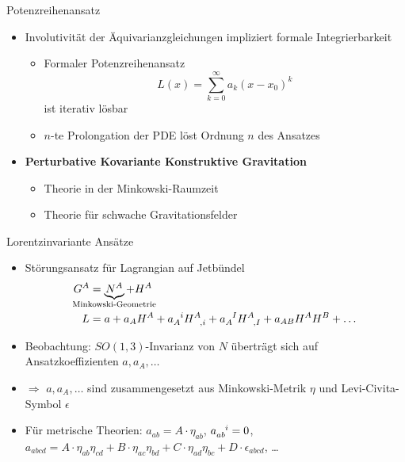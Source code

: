 \documentclass{beamer}
\begin{document}
    \begin{frame}{Potenzreihenansatz}
        \begin{itemize}
            \item Involutivität der Äquivarianzgleichungen impliziert formale Integrierbarkeit
            \begin{itemize}
                \item Formaler Potenzreihenansatz \[ L(x) = \sum_{k=0}^\infty a_k (x-x_0)^k \] ist iterativ lösbar
                \item $n$-te Prolongation der PDE löst Ordnung $n$ des Ansatzes
            \end{itemize} \pause
            \item \textbf{Perturbative Kovariante Konstruktive Gravitation}
            \begin{itemize}
                \item {} Theorie in der \alert{Minkowski}-Raumzeit
                \item {} Theorie für schwache Gravitationsfelder
            \end{itemize}
        \end{itemize}
    \end{frame}

    \begin{frame}{Lorentzinvariante Ansätze}
        \begin{itemize}
            \item Störungsansatz für Lagrangian auf Jetbündel
            \begin{align*}
                G^A &= \underbrace{N^A}_{\mathclap{\text{Minkowski-Geometrie}}} + H^A \\
                L &= a + a_A H^A + a_A^{\hphantom Ai} H^A_{\hphantom{A},i} + a_A^{\hphantom AI} H^A_{\hphantom{A},I} + a_{AB} H^A H^B + \ldots
            \end{align*}
            \item Beobachtung: $SO(1,3)$-Invarianz von $N$ überträgt sich auf Ansatzkoeffizienten $a, a_A, \ldots$
            \item $\Rightarrow$ $a, a_A, \ldots$ sind zusammengesetzt aus
            Minkowski-Metrik $\eta$ und Levi-Civita-Symbol $\epsilon$
            \item Für metrische Theorien: $a_{ab} = A \cdot \eta_{ab}$, $a_{ab}^{\hphantom{ab}i} = 0$, $a_{abcd} = A\cdot \eta_{ab} \eta_{cd} + B\cdot \eta_{ac} \eta_{bd} + C\cdot \eta_{ad} \eta_{bc} + D \cdot \epsilon_{abcd}$, \ldots
        \end{itemize}
    \end{frame}
\end{document}
